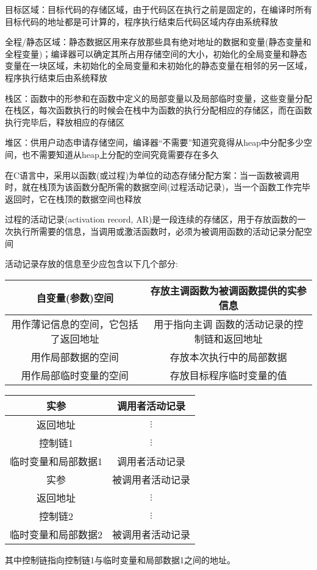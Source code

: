 \documentclass[utf8]{ctexart}
\begin{document}
目标区域：目标代码的存储区域，由于代码区在执行之前是固定的，在编译时所有目标代码的地址都是可计算的，程序执行结束后代码区域内存由系统释放

全程/静态区域：静态数据区用来存放那些具有绝对地址的数据和变量(静态变量和全程变量)；编译器可以确定其所占用存储空间的大小，初始化的全局变量和静态变量在一块区域，未初始化的全局变量和未初始化的静态变量在相邻的另一区域，程序执行结束后由系统释放

栈区：函数中的形参和在函数中定义的局部变量以及局部临时变量，这些变量分配在栈区，每次函数执行的时候会在栈中为函数的执行分配相应的存储区，而在函数执行完毕后，释放相应的存储区

堆区：供用户动态申请存储空间，编译器“不需要”知道究竟得从heap中分配多少空间，也不需要知道从heap上分配的空间究竟需要存在多久

在C语言中，采用以函数(或过程)为单位的动态存储分配方案：当一函数被调用时，就在栈顶为该函数分配所需的数据空间(过程活动记录)，当一个函数工作完毕返回时，它在栈顶的数据空间也释放

过程的活动记录(activation record, AR)是一段连续的存储区，用于存放函数的一次执行所需要的信息，当调用或激活函数时，必须为被调用函数的活动记录分配空间

活动记录存放的信息至少应包含以下几个部分:

\begin{center}
    \begin{tabular}{|c|c|}
    \hline
    自变量(参数)空间 & 存放主调函数为被调函数提供的实参信息 \\
    \hline
    用作薄记信息的空间，它包括了返回地址 & 用于指向主调 函数的活动记录的控制链和返回地址  \\
    \hline 
    用作局部数据的空间 & 存放本次执行中的局部数据 \\
    \hline
    用作局部临时变量的空间  & 存放目标程序临时变量的值\\
    \hline
    \end{tabular}
\end{center}
    
\begin{center}
    \begin{tabular}{|c|c|}
        \hline
        实参 & 调用者活动记录 \\
        \hline
        返回地址 & $\vdots$ \\
        \hline 
        控制链1 & $\vdots$ \\
        \hline
        临时变量和局部数据1 & 调用者活动记录 \\
        \hline
        实参 & 被调用者活动记录 \\
        \hline 
        返回地址 & $\vdots$ \\
        \hline
        控制链2 & $\vdots$ \\
        \hline 
        临时变量和局部数据2 & 被调用者活动记录 \\
        \hline 
        \end{tabular}
\end{center}
其中控制链指向控制链1与临时变量和局部数据1之间的地址。
\newline
\end{document}

